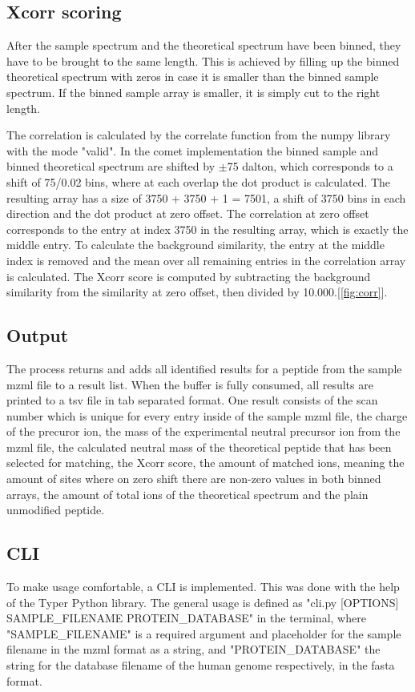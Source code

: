 \documentclass[11pt]{article}
\begin{document}
\subsection{Xcorr scoring}
After the sample spectrum and the theoretical spectrum have been binned, they have to be brought to the same length. This is achieved by filling up the binned theoretical spectrum with zeros in case it is smaller than the binned sample spectrum. If the binned sample array is smaller, it is simply cut to the right length. 

The correlation is calculated by the correlate function from the numpy library with the mode "valid". In the comet implementation the binned sample and binned theoretical spectrum are shifted by $\pm$75 dalton, which corresponds to a shift of 75/0.02 bins, where at each overlap the dot product is calculated. The resulting array has a size of 3750 + 3750 + 1 = 7501, a shift of 3750 bins in each direction and the dot product at zero offset. The correlation at zero offset corresponds to the entry at index 3750 in the resulting array, which is exactly the middle entry. To calculate the background similarity, the entry at the middle index is removed and the mean over all remaining entries in the correlation array is calculated. The Xcorr score is computed by subtracting the background similarity from the similarity at zero offset, then divided by 10.000.[\cref{fig:corr}].

\subsection{Output}
The process returns and adds all identified results for a peptide from the sample mzml file to a result list. When the buffer is fully consumed, all results are printed to a tsv file in tab separated format. One result consists of the scan number which is unique for every entry inside of the sample mzml file, the charge of the precuror ion, the mass of the experimental neutral precursor ion from the mzml file, the calculated neutral mass of the theoretical peptide that has been selected for matching, the Xcorr score, the amount of matched ions, meaning the amount of sites where on zero shift there are non-zero values in both binned arrays, the amount of total ions of the theoretical spectrum and the plain unmodified peptide.


\subsection{CLI}
To make usage comfortable, a CLI is implemented. This was done with the help of the Typer Python library. The general usage is defined as "cli.py [OPTIONS] SAMPLE\_FILENAME PROTEIN\_DATABASE" in the terminal, where "SAMPLE\_FILENAME" is a required argument and placeholder for the sample filename in the mzml format as a string, and "PROTEIN\_DATABASE" the string for the database filename of the human genome respectively, in the fasta format. 
\end{document}
